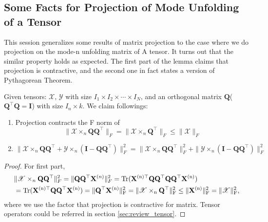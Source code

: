 \subsection{Some Facts for Projection of Mode Unfolding of a Tensor}
This session generalizes some results of matrix projection to the case where we do projection on the mode-n unfolding matrix of A tensor. It turns out that the similar property holds as expected. The first part of the lemma claims that projection is contractive, and the second one in fact states a version of Pythagorean Theorem.
\begin{lem}
\label{lemma:projection_tensors}
Given tensors: $\mathscr{X}$, $\mathscr{Y}$ with size $I_1\times I_2 \times \cdots \times I_N$, and an orthogonal matrix $\mathbf{Q}$($\mathbf{Q}^\top \mathbf{Q} = \mathbf{I}$) with size $I_n\times k$. We claim followings:
\begin{enumerate}
\item Projection contracts the F norm of 
\begin{equation}
\|\mathscr{X} \times_n \mathbf{Q}\mathbf{Q}^\top\|_F = \|\mathscr{X} \times_n \mathbf{Q}^\top\|_F\le \|\mathscr{X}\|_F
\end{equation}
\item 
\begin{equation}
\|\mathscr{X} \times_n \mathbf{Q}\mathbf{Q}^\top + \mathscr{Y}\times_n (\mathbf{I}-\mathbf{Q}\mathbf{Q}^\top)\|_F^2 = \|\mathscr{X} \times_n \mathbf{Q}\mathbf{Q}^\top\|_F^2+\|\mathscr{Y}\times_n (\mathbf{I}-\mathbf{Q}\mathbf{Q}^\top)\|_F^2
\end{equation}
\end{enumerate}
\begin{proof}
For first part, 
\begin{equation}
\begin{aligned}
&\|\mathscr{X} \times_n \mathbf{Q}\mathbf{Q}^\top\|_F^2 = \|\mathbf{Q}\mathbf{Q}^\top \mathbf{X}^{(n)} \|_F^2 = \rm{Tr}(\mathbf{X}^{(n)\top}\mathbf{Q}\mathbf{Q}^\top \mathbf{Q}\mathbf{Q}^\top \mathbf{X}^{(n)} )\\
&=\rm{Tr}(\mathbf{X}^{(n)\top}\mathbf{Q}\mathbf{Q}^\top \mathbf{X}^{(n)} ) =\|\mathbf{Q}^\top \mathbf{X}^{(n)}\|_F^2 = \|\mathscr{X} \times_n \mathbf{Q}^\top\|_F^2 \le \|\mathbf{X}^{(n)}\|_F^2 = \|\mathscr{X}\|_F^2,
\end{aligned}
\end{equation}
where we use the factor that projection is contractive for matrix. Tensor operators could be referred in section \ref{sec:review_tensor}.  \par 

\end{proof}
\end{lem}
